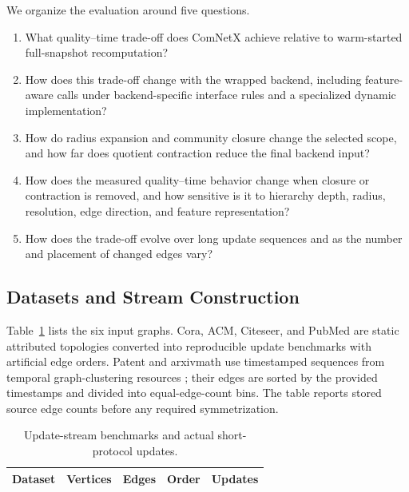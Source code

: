 \documentclass{ieeeaccess}
\begin{document}
We organize the evaluation around five questions.
\begin{enumerate}
\item[\textbf{RQ1}] What quality--time trade-off does ComNetX achieve relative
to warm-started full-snapshot recomputation?
\item[\textbf{RQ2}] How does this trade-off change with the wrapped backend,
including feature-aware calls under backend-specific interface rules and a
specialized dynamic implementation?
\item[\textbf{RQ3}] How do radius expansion and community closure change the
selected scope, and how far does quotient contraction reduce the final backend
input?
\item[\textbf{RQ4}] How does the measured quality--time behavior change when
closure or contraction is removed, and how sensitive is it to hierarchy depth,
radius, resolution, edge direction, and feature representation?
\item[\textbf{RQ5}] How does the trade-off evolve over long update sequences
and as the number and placement of changed edges vary?
\end{enumerate}

\subsection{Datasets and Stream Construction}

Table~\ref{tab:datasets} lists the six input graphs. Cora, ACM, Citeseer, and
PubMed are static attributed topologies converted into reproducible update
benchmarks with artificial edge orders. Patent and arxivmath use
timestamped sequences from temporal graph-clustering
resources \cite{Liu2025BenchTGC,Liu2023Arxiv4TGC}; their edges are sorted by
the provided timestamps and divided into equal-edge-count bins. The table
reports stored source edge counts before any required symmetrization.

\begin{table}[t]
\centering
\caption{Update-stream benchmarks and actual short-protocol updates.}
\label{tab:datasets}
\setlength{\tabcolsep}{2.2pt}
\scriptsize
\begin{tabular}{@{}lrrlc@{}}
\toprule
\textbf{Dataset} & \textbf{Vertices} & \textbf{Edges} &
\textbf{Order} & \textbf{Updates} \\
\midrule

\end{tabular}
\end{table}
\end{document}
